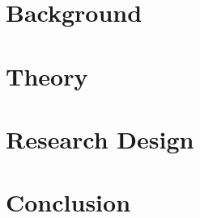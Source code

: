 \documentclass[11pt,article,oneside]{memoir}
\begin{document}
\section{Background}\label{sec:background}

\section{Theory}\label{sec:theory}

\section{Research Design}\label{sec:rd}

\section{Conclusion}\label{sec:conclusion}

\newpage
\printbibliography
\end{document}
